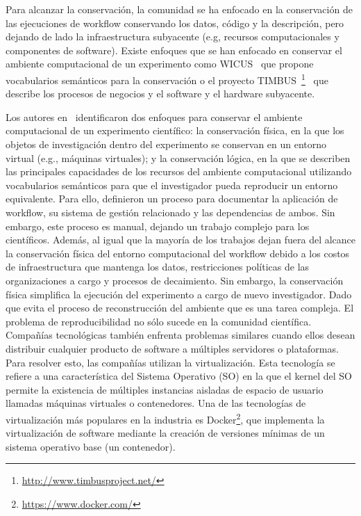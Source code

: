 Para alcanzar la conservación, la comunidad se ha enfocado en la conservación de las ejecuciones de workflow conservando los datos, código y la descripción, pero dejando de lado la infraestructura subyacente (e.g, recursos computacionales y componentes de software).
Existe enfoques que se han enfocado en conservar el ambiente computacional de un experimento como WICUS~\cite{santana2017reproducibility} que propone vocabularios semánticos para la conservación o el proyecto TIMBUS~\footnote{\url{http://www.timbusproject.net/}}~\cite{dappert2013describing} que describe los procesos de negocios y el software y el hardware subyacente.

Los autores en~\cite{santana2017reproducibility} identificaron dos enfoques para conservar el ambiente computacional de un experimento científico: la conservación física, en la que los objetos de investigación dentro del experimento se conservan en un entorno virtual (e.g., máquinas virtuales); y la conservación lógica, en la que se describen las principales capacidades de los recursos del ambiente computacional utilizando vocabularios semánticos para que el investigador pueda reproducir un entorno equivalente.
Para ello, definieron un proceso para documentar la aplicación de workflow, su sistema de gestión relacionado y las dependencias de ambos.
Sin embargo, este proceso es manual, dejando un trabajo complejo para los científicos. 
Además, al igual que la mayoría de los trabajos dejan fuera del alcance la conservación física del entorno computacional del workflow debido a los costos de infraestructura que mantenga los datos, restricciones políticas de las organizaciones a cargo y procesos de decaimiento.
Sin embargo, la conservación física simplifica la ejecución del experimento a cargo de nuevo investigador. Dado que evita el proceso de reconstrucción del ambiente que es una tarea compleja.
El problema de reproducibilidad no sólo sucede en la comunidad científica. Compañías tecnológicas también enfrenta problemas similares cuando ellos desean distribuir cualquier producto de software a múltiples servidores o plataformas.
Para resolver esto, las compañías utilizan la virtualización. Esta tecnología se refiere a una característica del Sistema Operativo (SO) en la que el kernel del SO permite la existencia de múltiples instancias aisladas de espacio de usuario llamadas máquinas virtuales o contenedores.
Una de las tecnologías de virtualización más populares en la industria es Docker\footnote{\url{https://www.docker.com/}}, que implementa la virtualización de software mediante la creación de versiones mínimas de un sistema operativo base (un contenedor).
